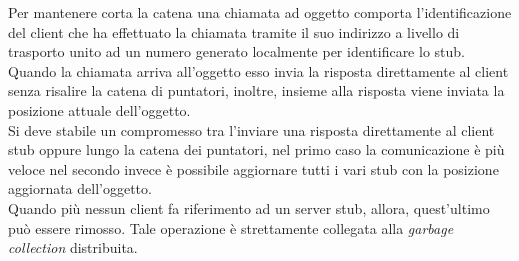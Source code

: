 Per mantenere corta la catena una chiamata ad oggetto comporta l'identificazione del client che ha effettuato la chiamata tramite il suo indirizzo a livello di trasporto unito ad un numero generato localmente per identificare lo stub. Quando la chiamata arriva all'oggetto esso invia la risposta direttamente al client senza risalire la catena di puntatori, inoltre, insieme alla risposta viene inviata la posizione attuale dell'oggetto.\\
Si deve stabile un compromesso tra l'inviare una risposta direttamente al client stub oppure lungo la catena dei puntatori, nel primo caso la comunicazione è più veloce nel secondo invece è possibile aggiornare tutti i vari stub con la posizione aggiornata dell'oggetto.\\
Quando più nessun client fa riferimento ad un server stub, allora, quest'ultimo può essere rimosso. Tale operazione è strettamente collegata alla \emph{garbage collection} distribuita.
